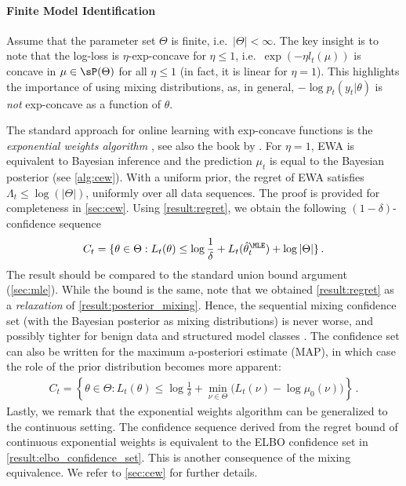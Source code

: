 


\paragraph{Finite Model Identification} Assume that the parameter set $\Theta$ is finite, i.e.~$|\Theta|< \infty$. The key insight is to note that the log-loss is $\eta$-exp-concave for $\eta \leq 1$, i.e.~$\exp(-\eta l_t(\mu))$ is concave in $\mu \in \sP(\Theta)$ for all $\eta \leq 1$ (in fact, it is linear for $\eta=1$). This highlights the importance of using mixing distributions, as, in general, $-\log p_t(y_t|\theta)$ is \emph{not} exp-concave as a function of $\theta$.

The standard approach for online learning with exp-concave functions is the \emph{exponential weights algorithm} \citep[EWA, ][]{littlestone1994weighted,freund1997decision}, see also the book by \citet{cesa2006prediction}. For $\eta=1$, EWA is equivalent to Bayesian inference and the prediction $\mu_t$ is equal to the Bayesian posterior (see \cref{alg:cew}). With a uniform prior, the regret of EWA satisfies $\Lambda_t \leq \log(|\Theta|)$, uniformly over all data sequences. The proof is provided for completeness in \cref{sec:cew}. Using \cref{result:regret}, we obtain the following $(1-\delta)$-confidence sequence
\begin{align*}
    C_t = \{\theta \in \Theta : L_t(\theta) \leq \log \frac{1}{\delta} + L_t(\hat \theta_t^\MLE) + \log |\Theta| \} \,.
\end{align*}
The result should be compared to the standard union bound argument (\cref{sec:mle}). While the bound is the same, note that we obtained \cref{result:regret} as a \emph{relaxation} of \cref{result:posterior_mixing}. Hence, the sequential mixing confidence set (with the Bayesian posterior as mixing distributions) is never worse, and possibly tighter for benign data and structured model classes \citep[e.g.,][]{auer2002adaptive,cesa2007improved,de2014follow}. The confidence set can also be written for the maximum a-posteriori estimate (MAP), in which case the role of the prior distribution becomes more apparent:
\begin{align*}
    C_t = \left\{\theta \in \Theta : L_t(\theta) \leq \log \frac{1}{\delta} + \min_{\nu \in \Theta} \big( L_t(\nu) - \log \mu_0(\nu) \big)\right\} \,.
\end{align*}
Lastly, we remark that the exponential weights algorithm can be generalized to the continuous setting. The confidence sequence derived from the regret bound of continuous exponential weights is equivalent to the ELBO confidence set in \cref{result:elbo_confidence_set}. This is another consequence of the mixing equivalence. We refer to \cref{sec:cew} for further details.
